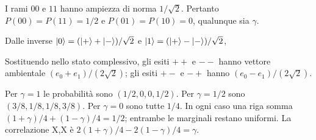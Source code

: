 \ExSolution


I rami \(00\) e \(11\) hanno ampiezza di norma \(1/\sqrt2\). Pertanto \(P(00)=P(11)=1/2\) e \(P(01)=P(10)=0\), qualunque sia \(\gamma\).


Dalle inverse \(\lvert 0\rangle=(\lvert +\rangle +\lvert -\rangle)/\sqrt2\) e \(\lvert 1\rangle=(\lvert +\rangle -\lvert -\rangle)/\sqrt2\),


Sostituendo nello stato complessivo, gli esiti \(++\) e \(--\) hanno vettore ambientale \((e_0+e_1)/(2\sqrt2)\); gli esiti \(+-\) e \(-+\) hanno \((e_0-e_1)/(2\sqrt2)\).




Per \(\gamma=1\) le probabilità sono \((1/2,0,0,1/2)\). Per \(\gamma=1/2\) sono \((3/8,1/8,1/8,3/8)\). Per \(\gamma=0\) sono tutte \(1/4\). In ogni caso una riga somma \((1+\gamma)/4+(1-\gamma)/4=1/2\); entrambe le marginali restano uniformi. La correlazione X,X è \(2(1+\gamma)/4-2(1-\gamma)/4=\gamma\).

